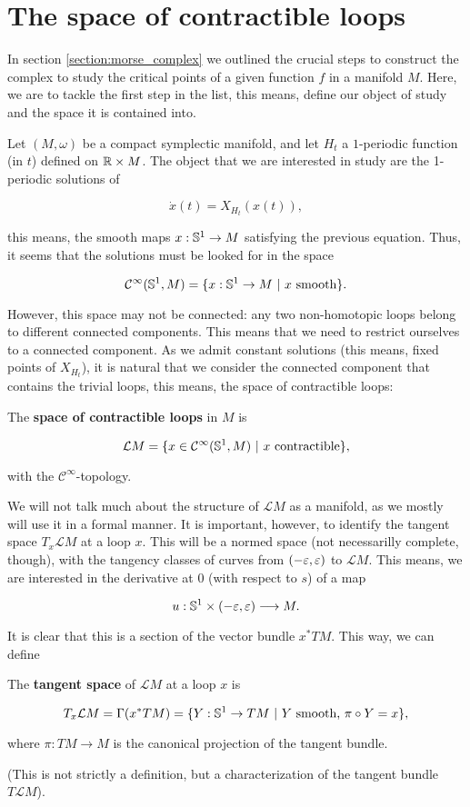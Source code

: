 \section{The space of contractible loops} \label{section:floerq_loops}

In section \ref{section:morse_complex} we outlined the crucial steps to construct the complex to study the critical points of a given function $f$ in a manifold $M$. Here, we are to tackle the first step in the list, this means, define our object of study and the space it is contained into.

Let $(M,\omega)$ be a compact symplectic manifold, and let $H_t$ a $1$-periodic function (in $t$) defined on $\mathbb{R} \times M$. The object that we are interested in study are the 1-periodic solutions of

$$\dot{x}(t) = X_{H_t}(x(t)) ,$$

this means, the smooth maps $x : \mathbb{S}^1 \rightarrow M$ satisfying the previous equation. Thus, it seems that the solutions must be looked for in the space

$$\mathcal{C}^{\infty}(\mathbb{S}^1,M) = \{ x : \mathbb{S}^1 \rightarrow M \ | \ x \text{ smooth} \} .$$

However, this space may not be connected: any two non-homotopic loops belong to different connected components. This means that we need to restrict ourselves to a connected component. As we admit constant solutions (this means, fixed points of $X_{H_t}$), it is natural that we consider the connected component that contains the trivial loops, this means, the space of contractible loops:

\begin{deff}
The {\bf space of contractible loops} in $M$ is

$$\mathcal{L}M = \{ x \in \mathcal{C}^{\infty}(\mathbb{S}^1,M) \ | \ x \text{ contractible} \} ,$$

with the $\mathcal{C}^{\infty}$-topology.
\end{deff}

We will not talk much about the structure of $\mathcal{L}M$ as a manifold, as we mostly will use it in a formal manner. It is important, however, to identify the tangent space $T_x\mathcal{L}M$ at a loop $x$. This will be a normed space (not necessarilly complete, though), with the tangency classes of curves from $(-\varepsilon,\varepsilon)$ to $\mathcal{L}M$. This means, we are interested in the derivative at $0$ (with respect to $s$) of a map

$$u : \mathbb{S}^1 \times (-\varepsilon,\varepsilon) \longrightarrow M .$$

It is clear that this is a section of the vector bundle $x^{\ast}TM$. This way, we can define

\begin{deff}
The {\bf tangent space} of $\mathcal{L}M$ at a loop $x$ is

$$T_x\mathcal{L}M = \Gamma(x^{\ast}TM) = \{ Y : \mathbb{S}^1 \rightarrow TM \ | \ Y \text{ smooth, } \pi \circ Y = x\},$$

where $\pi : TM \rightarrow M$ is the canonical projection of the tangent bundle.
\end{deff}

(This is not strictly a definition, but a characterization of the tangent bundle $T\mathcal{L}M$).
